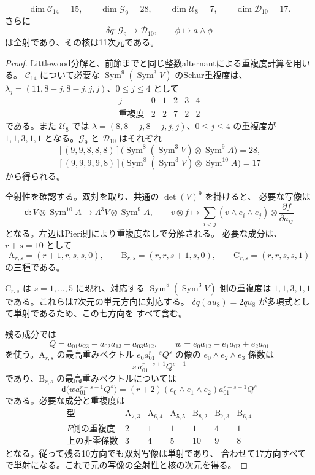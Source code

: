 \begin{proposition}[14次の次元とPfaffian微分の全射性]
\label{prop:v11-fourteenth-characters}
\[
 \dim\mathcal C_{14}=15,\qquad
 \dim\mathcal G_9=28,\qquad
 \dim\mathcal U_8=7,\qquad
 \dim\mathcal D_{10}=17.
\]
さらに
\[
 \delta q:\mathcal G_9\longrightarrow\mathcal D_{10},
 \qquad \phi\longmapsto a\wedge\phi
\]
は全射であり、その核は11次元である。
\end{proposition}
\begin{proof}
Littlewood分解と、前節までと同じ整数alternantによる重複度計算を用いる。
$\mathcal C_{14}$ について必要な
$\operatorname{Sym}^9(\operatorname{Sym}^3V)$ のSchur重複度は、
$\lambda_j=(11,8-j,8-j,j,j)$、$0\le j\le4$ として
\[
\begin{array}{c|ccccc}
 j&0&1&2&3&4\\\hline
 \text{重複度}&2&2&7&2&2
\end{array}
\]
である。また $\mathcal U_8$ では
$\lambda=(8,8-j,8-j,j,j)$、$0\le j\le4$ の重複度が
$1,1,3,1,1$ となる。$\mathcal G_9$ と $\mathcal D_{10}$ はそれぞれ
\[
 [(9,9,8,8,8)]\bigl(
   \operatorname{Sym}^8(\operatorname{Sym}^3V)
   \otimes\operatorname{Sym}^{9}A\bigr)=28,
\]
\[
 [(9,9,9,9,8)]\bigl(
   \operatorname{Sym}^8(\operatorname{Sym}^3V)
   \otimes\operatorname{Sym}^{10}A\bigr)=17
\]
から得られる。

全射性を確認する。双対を取り、共通の $\det(V)^9$ を掛けると、
必要な写像は
\[
 \mathsf d:V\otimes\operatorname{Sym}^{10}A
       \longrightarrow\Lambda^3V\otimes\operatorname{Sym}^{9}A,
 \qquad
 v\otimes f\longmapsto
 \sum_{i<j}(v\wedge e_i\wedge e_j)\otimes
                         \frac{\partial f}{\partial a_{ij}}
\]
となる。左辺はPieri則により重複度なしで分解される。
必要な成分は、$r+s=10$ として
\[
 \mathrm A_{r,s}=(r+1,r,s,s,0),\qquad
 \mathrm B_{r,s}=(r,r,s+1,s,0),\qquad
 \mathrm C_{r,s}=(r,r,s,s,1)
\]
の三種である。

$\mathrm C_{r,s}$ は $s=1,\ldots,5$ に現れ、対応する
$\operatorname{Sym}^8(\operatorname{Sym}^3V)$ 側の重複度は
$1,1,3,1,1$ である。これらは7次元の単元方向に対応する。
$\delta q(a u_8)=2q u_8$ が多項式として単射であるため、この七方向を
すべて含む。

残る成分では
\[
 Q=a_{01}a_{23}-a_{02}a_{13}+a_{03}a_{12},\qquad
 w=e_0a_{12}-e_1a_{02}+e_2a_{01}
\]
を使う。$\mathrm A_{r,s}$ の最高重みベクトル
$e_0a_{01}^{r-s}Q^s$ の像の $e_0\wedge e_2\wedge e_3$ 係数は
\[
 s\,a_{01}^{r-s+1}Q^{s-1}
\]
であり、$\mathrm B_{r,s}$ の最高重みベクトルについては
\[
 \mathsf d\bigl(w a_{01}^{r-s-1}Q^s\bigr)
   =(r+2)(e_0\wedge e_1\wedge e_2)a_{01}^{r-s-1}Q^s
\]
である。必要な成分と重複度は
\[
\begin{array}{c|ccc|ccc}
 \text{型}&\mathrm A_{7,3}&\mathrm A_{6,4}&\mathrm A_{5,5}
           &\mathrm B_{8,2}&\mathrm B_{7,3}&\mathrm B_{6,4}\\\hline
 \text{$F$側の重複度}&2&1&1&1&4&1\\
 \text{上の非零係数}&3&4&5&10&9&8
\end{array}
\]
となる。従って残る10方向でも双対写像は単射であり、
合わせて17方向すべてで単射になる。これで元の写像の全射性と核の次元を得る。
\end{proof}

